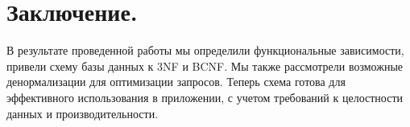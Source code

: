 \section{Заключение.}
В результате проведенной работы мы определили функциональные зависимости, привели схему базы данных к 3NF и BCNF. Мы также
рассмотрели возможные денормализации для оптимизации запросов. Теперь схема готова для эффективного использования в приложении,
с учетом требований к целостности данных и производительности.
